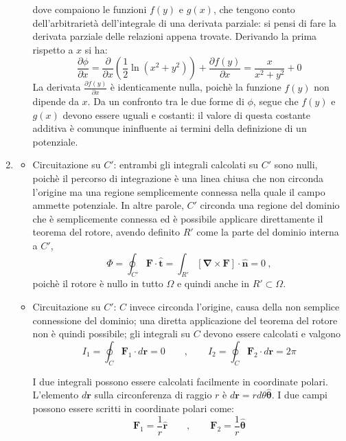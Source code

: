 \begin{enumerate}
\begin{itemize}
dove compaiono le funzioni $f(y)$ e $g(x)$, che tengono conto dell'arbitrarietà dell'integrale di una derivata parziale: si pensi di fare
la derivata parziale delle relazioni appena trovate. Derivando la prima rispetto a $x$ si ha:
\begin{equation}
  \frac{\partial \phi}{\partial x} = \frac{\partial}{\partial x} \displaystyle\left(\frac{1}{2} \ln (x^2+y^2)\right) + 
               \frac{\partial f(y)}{\partial x} = \frac{x}{x^2+y^2} + 0
\end{equation}
La derivata $\frac{\partial f(y)}{\partial x}$ è identicamente nulla, poichè la funzione $f(y)$ non dipende da $x$.
Da un confronto tra le due forme di $\phi$, segue che $f(y)$ e $g(x)$ devono essere uguali e costanti: il valore di questa costante
additiva è comunque ininfluente ai termini della definizione di un potenziale.

\end{itemize}

\item 
\begin{itemize}

\item{Circuitazione su $C'$}:
entrambi gli integrali calcolati su $C'$ sono nulli, poichè il percorso di integrazione è una linea 
 chiusa che non circonda l'origine ma una regione semplicemente connessa nella quale il campo ammette
 potenziale. In altre parole, $C'$ circonda una regione del dominio che è semplicemente connessa ed è
 possibile applicare direttamente il teorema del rotore, avendo definito $R'$ come la parte del dominio interna a $C'$,
\begin{equation}
  \Phi = \oint_{C'} \bm{F} \cdot \bm{\hat{t}} = \int_{R'} [\bm{\nabla} \times \bm{F}] \cdot \bm{\hat{n}} = 0 \ ,
\end{equation}
poichè il rotore è nullo in tutto $\Omega$ e quindi anche in $R' \subset \Omega$.

\item{Circuitazione su $C'$}: $C$ invece circonda l'origine, causa della non semplice connessione
 del dominio; una diretta applicazione del teorema del rotore non è quindi possibile;
 gli integrali su $C$ devono essere calcolati e valgono
\begin{equation}
I_1 = \oint_C \bm{F}_1 \cdot d\bm{r} = 0 \qquad , \qquad
I_2 = \oint_C \bm{F}_2 \cdot d\bm{r} = 2 \pi
\end{equation}

I due integrali possono essere calcolati facilmente in coordinate polari. L'elemento $d\bm{r}$ sulla circonferenza di raggio $r$ è $d\bm{r} = r d\theta \bm{\hat{\theta}}$.
I due campi possono essere scritti in coordinate polari come:
\begin{equation}
  \bm{F}_1 = \frac{1}{r} \bm{\hat{r}} \qquad , \qquad   \bm{F}_2 = \frac{1}{r} \bm{\hat{\theta}} 
\end{equation}


\end{itemize}
\end{enumerate}
